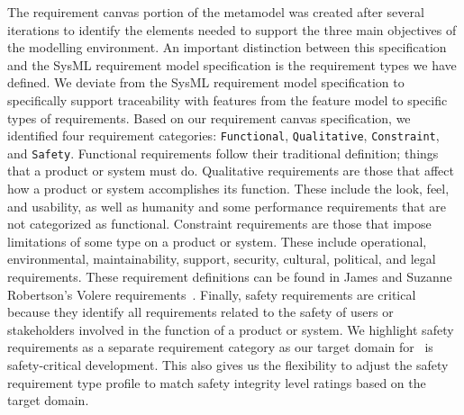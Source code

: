 
The requirement canvas portion of the metamodel was created after several iterations to identify the elements needed to support the three main objectives of the modelling environment. An important distinction between this specification and the SysML requirement model specification is the requirement types we have defined. We deviate from the SysML requirement model specification to specifically support traceability with features from the feature model to specific types of requirements. Based on our requirement canvas specification, we identified four requirement categories: \texttt{Functional}, \texttt{Qualitative}, \texttt{Constraint}, and \texttt{Safety}. Functional requirements follow their traditional definition; things that a product or system must do. Qualitative requirements are those that affect how a product or system accomplishes its function. These include the look, feel, and usability, as well as humanity and some performance requirements that are not categorized as functional. Constraint requirements are those that impose limitations of some type on a product or system. These include operational, environmental, maintainability, support, security, cultural, political, and legal requirements. These requirement definitions can be found in James and Suzanne Robertson's Volere requirements~\cite{robertson2000volere}. Finally, safety requirements are critical because they identify all requirements related to the safety of users or stakeholders involved in the function of a product or system. We highlight safety requirements as a separate requirement category as our target domain for \tool\ is safety-critical development. This also gives us the flexibility to adjust the safety requirement type profile to match safety integrity level ratings based on the target domain.

